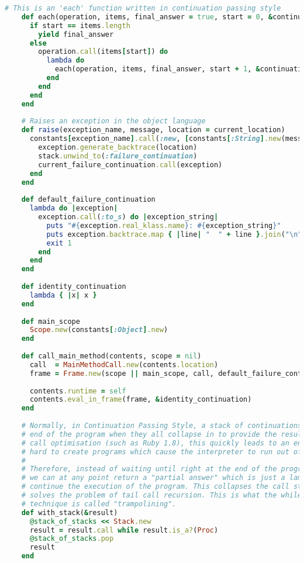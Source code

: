 \begin{lstlisting}[title={\small\Helvetica runtime/runtime.rb},language=Ruby]
    # This is an 'each' function written in continuation passing style
    def each(operation, items, final_answer = true, start = 0, &continuation)
      if start == items.length
        yield final_answer
      else
        operation.call(items[start]) do
          lambda do
            each(operation, items, final_answer, start + 1, &continuation)
          end
        end
      end
    end
    
    # Raises an exception in the object language
    def raise(exception_name, message, location = current_location)
      constants[exception_name].call(:new, [constants[:String].new(message)]) do |exception|
        exception.generate_backtrace(location)
        stack.unwind_to(:failure_continuation)
        current_failure_continuation.call(exception)
      end
    end
    
    def default_failure_continuation
      lambda do |exception|
        exception.call(:to_s) do |exception_string|
          puts "#{exception.real_klass.name}: #{exception_string}"
          puts exception.backtrace.map { |line| "  " + line }.join("\n")
          exit 1
        end
      end
    end
    
    def identity_continuation
      lambda { |x| x }
    end
    
    def main_scope
      Scope.new(constants[:Object].new)
    end
    
    def call_main_method(contents, scope = nil)
      call  = MainMethodCall.new(contents.location)
      frame = Frame.new(scope || main_scope, call, default_failure_continuation)
      
      contents.runtime = self
      contents.eval_in_frame(frame, &identity_continuation)
    end
    
    # Normally, in Continuation Passing Style, a stack of continuations is built up right until the
    # end of the program when they all collapse in to provide the result. In languages without tail
    # call optimisation (such as Ruby 1.8), this quickly leads to an enormous stack, and it's not
    # hard to create programs which cause the interpreter to run out of stack space.
    # 
    # Therefore, instead of waiting until right at the end of the program to return the answer,
    # we can at any point return a "partial answer" which is just a lambda which can be called to
    # continue the execution of the program. This collapses the call stack right back down, so
    # solves the problem of tail call recursion. This is what the while loop is doing. This
    # technique is called "trampolining".
    def with_stack(&result)
      @stack_of_stacks << Stack.new
      result = result.call while result.is_a?(Proc)
      @stack_of_stacks.pop
      result
    end
    

\end{lstlisting}
